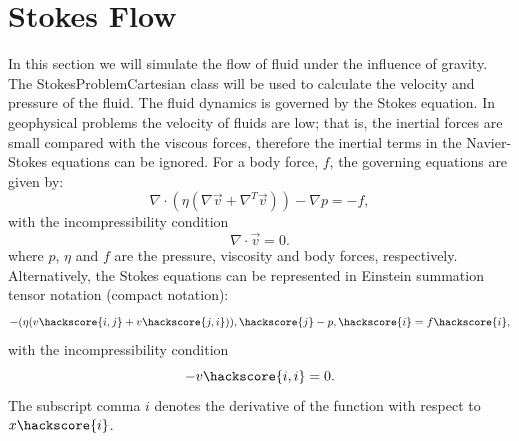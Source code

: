 
\section{Stokes Flow}
\label{STOKES FLOW CHAP}

In this section we will simulate the flow of fluid under the influence of gravity. The StokesProblemCartesian class will be used to calculate the velocity and pressure of the fluid.
The fluid dynamics is governed by the Stokes equation. In geophysical problems the velocity of fluids are low; that is, the inertial forces are small compared with the viscous forces, therefore the inertial terms in the Navier-Stokes equations can be ignored. For a body force, $f$, the governing equations are given by:
%
\begin{equation}
\nabla \cdot (\eta(\nabla \vec{v} + \nabla^{T} \vec{v})) - \nabla p = -f,
\label{GENERAL NAVIER STOKES}
\end{equation}
%
with the incompressibility condition
%
\begin{equation}
\nabla \cdot \vec{v} = 0.
\label{INCOMPRESSIBILITY}
\end{equation}
%
where $p$, $\eta$ and $f$ are the pressure, viscosity and body forces, respectively. 
Alternatively, the Stokes equations can be represented in Einstein summation tensor notation (compact notation):
%
\begin{equation}
-(\eta(v\hackscore{i,j} + v\hackscore{j,i})),\hackscore{j} - p,\hackscore{i} = f\hackscore{i},
\label{GENERAL NAVIER STOKES COM}
\end{equation}
%
with the incompressibility condition
%
\begin{equation}
-v\hackscore{i,i} = 0.
\label{INCOMPRESSIBILITY COM}
\end{equation}
%
The subscript comma $i$ denotes the derivative of the function with respect to $x\hackscore{i}$.
%
%
%
